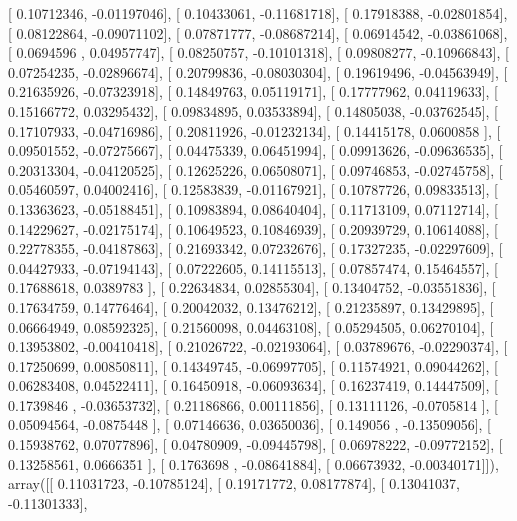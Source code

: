 \documentclass{article}
\begin{document}
       [ 0.10712346, -0.01197046],
       [ 0.10433061, -0.11681718],
       [ 0.17918388, -0.02801854],
       [ 0.08122864, -0.09071102],
       [ 0.07871777, -0.08687214],
       [ 0.06914542, -0.03861068],
       [ 0.0694596 ,  0.04957747],
       [ 0.08250757, -0.10101318],
       [ 0.09808277, -0.10966843],
       [ 0.07254235, -0.02896674],
       [ 0.20799836, -0.08030304],
       [ 0.19619496, -0.04563949],
       [ 0.21635926, -0.07323918],
       [ 0.14849763,  0.05119171],
       [ 0.17777962,  0.04119633],
       [ 0.15166772,  0.03295432],
       [ 0.09834895,  0.03533894],
       [ 0.14805038, -0.03762545],
       [ 0.17107933, -0.04716986],
       [ 0.20811926, -0.01232134],
       [ 0.14415178,  0.0600858 ],
       [ 0.09501552, -0.07275667],
       [ 0.04475339,  0.06451994],
       [ 0.09913626, -0.09636535],
       [ 0.20313304, -0.04120525],
       [ 0.12625226,  0.06508071],
       [ 0.09746853, -0.02745758],
       [ 0.05460597,  0.04002416],
       [ 0.12583839, -0.01167921],
       [ 0.10787726,  0.09833513],
       [ 0.13363623, -0.05188451],
       [ 0.10983894,  0.08640404],
       [ 0.11713109,  0.07112714],
       [ 0.14229627, -0.02175174],
       [ 0.10649523,  0.10846939],
       [ 0.20939729,  0.10614088],
       [ 0.22778355, -0.04187863],
       [ 0.21693342,  0.07232676],
       [ 0.17327235, -0.02297609],
       [ 0.04427933, -0.07194143],
       [ 0.07222605,  0.14115513],
       [ 0.07857474,  0.15464557],
       [ 0.17688618,  0.0389783 ],
       [ 0.22634834,  0.02855304],
       [ 0.13404752, -0.03551836],
       [ 0.17634759,  0.14776464],
       [ 0.20042032,  0.13476212],
       [ 0.21235897,  0.13429895],
       [ 0.06664949,  0.08592325],
       [ 0.21560098,  0.04463108],
       [ 0.05294505,  0.06270104],
       [ 0.13953802, -0.00410418],
       [ 0.21026722, -0.02193064],
       [ 0.03789676, -0.02290374],
       [ 0.17250699,  0.00850811],
       [ 0.14349745, -0.06997705],
       [ 0.11574921,  0.09044262],
       [ 0.06283408,  0.04522411],
       [ 0.16450918, -0.06093634],
       [ 0.16237419,  0.14447509],
       [ 0.1739846 , -0.03653732],
       [ 0.21186866,  0.00111856],
       [ 0.13111126, -0.0705814 ],
       [ 0.05094564, -0.0875448 ],
       [ 0.07146636,  0.03650036],
       [ 0.149056  , -0.13509056],
       [ 0.15938762,  0.07077896],
       [ 0.04780909, -0.09445798],
       [ 0.06978222, -0.09772152],
       [ 0.13258561,  0.0666351 ],
       [ 0.1763698 , -0.08641884],
       [ 0.06673932, -0.00340171]]), array([[ 0.11031723, -0.10785124],
       [ 0.19171772,  0.08177874],
       [ 0.13041037, -0.11301333],
\end{document}
